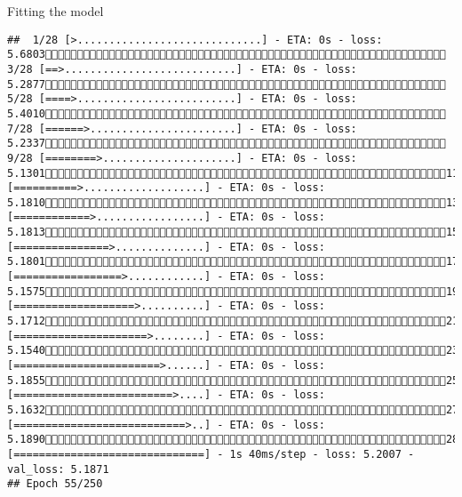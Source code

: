 \documentclass[
  ignorenonframetext,
]{beamer}
\begin{document}
\begin{frame}[fragile]{Fitting the model}
\begin{verbatim}
##  1/28 [>.............................] - ETA: 0s - loss: 5.6803 3/28 [==>...........................] - ETA: 0s - loss: 5.2877 5/28 [====>.........................] - ETA: 0s - loss: 5.4010 7/28 [======>.......................] - ETA: 0s - loss: 5.2337 9/28 [========>.....................] - ETA: 0s - loss: 5.130111/28 [==========>...................] - ETA: 0s - loss: 5.181013/28 [============>.................] - ETA: 0s - loss: 5.181315/28 [===============>..............] - ETA: 0s - loss: 5.180117/28 [=================>............] - ETA: 0s - loss: 5.157519/28 [===================>..........] - ETA: 0s - loss: 5.171221/28 [=====================>........] - ETA: 0s - loss: 5.154023/28 [=======================>......] - ETA: 0s - loss: 5.185525/28 [=========================>....] - ETA: 0s - loss: 5.163227/28 [===========================>..] - ETA: 0s - loss: 5.189028/28 [==============================] - 1s 40ms/step - loss: 5.2007 - val_loss: 5.1871
## Epoch 55/250

\end{verbatim}
\end{frame}
\end{document}
